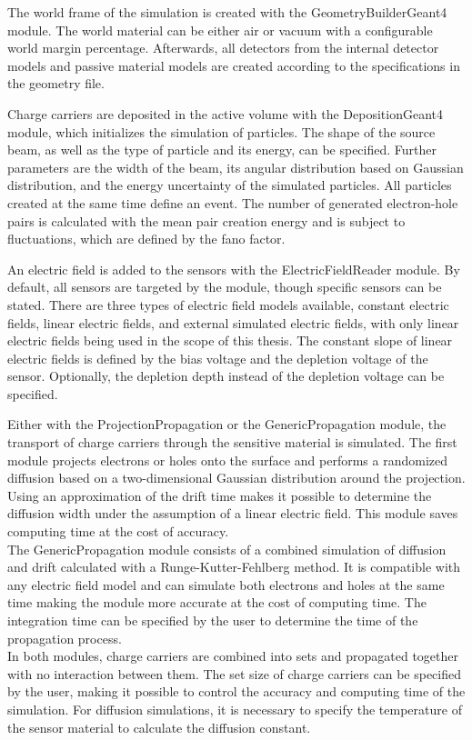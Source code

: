 The world frame of the simulation is created with the GeometryBuilderGeant4 module. The world material can be either air or vacuum with a configurable world margin percentage.
Afterwards, all detectors from the internal detector models and passive material models are created according to the specifications in the geometry file.

Charge carriers are deposited in the active volume with the DepositionGeant4 module, which initializes the simulation of particles. The shape of the source beam, as well
as the type of particle and its energy, can be specified. Further parameters are the width of the beam, its angular distribution based on Gaussian distribution, and the energy
uncertainty of the simulated particles. All particles created at the same time define an event. The number of generated electron-hole pairs is calculated with the
mean pair creation energy and is subject to fluctuations, which are defined by the fano factor.

An electric field is added to the sensors with the ElectricFieldReader module. By default, all sensors are targeted by the module, though specific sensors can be stated.
There are three types of electric field models available, constant electric fields, linear electric fields, and external simulated electric fields, with only
linear electric fields being used in the scope of this thesis. The constant slope of linear electric fields is defined by the bias voltage and the
depletion voltage of the sensor. Optionally, the depletion depth instead of the depletion voltage can be specified.

Either with the ProjectionPropagation or the GenericPropagation module, the transport of charge carriers through the sensitive material is simulated.
The first module projects electrons or holes onto the surface and performs a randomized diffusion based on a two-dimensional Gaussian distribution around
the projection. Using an approximation of the drift time makes it possible to determine the diffusion width under the assumption of a linear electric field. This
module saves computing time at the cost of accuracy. \\
The GenericPropagation module consists of a combined simulation of diffusion and drift calculated with a Runge-Kutter-Fehlberg method.
It is compatible with any electric field model and can simulate both electrons and holes
at the same time making the module
more accurate at the cost of computing time. The integration time can be specified by the user to determine the time of the propagation process. \\
In both modules, charge carriers are combined into sets and propagated together with no interaction between them. The set size of charge carriers can be specified by the user,
making it possible to control the accuracy and computing time of the simulation. For diffusion simulations, it is necessary to specify the temperature of the sensor material
to calculate the diffusion constant.

